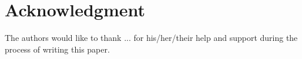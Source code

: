 \section*{Acknowledgment}
The authors would like to thank ... for his/her/their help and support during the process of writing this paper. 